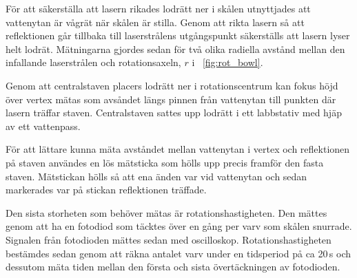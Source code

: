 \documentclass[11pt,a4paper]{article}
\newcommand{\figref}{\figurename~\ref}
\begin{document}
För att säkerställa att lasern rikades lodrätt ner i skålen utnyttjades att vattenytan är vågrät när skålen är stilla. Genom att rikta lasern så att reflektionen går tillbaka till laserstrålens utgångspunkt säkerställs att lasern lyser helt lodrät. Mätningarna gjordes sedan för två olika radiella avstånd mellan den infallande laserstrålen och rotationsaxeln, $r$ i \figref{fig:rot_bowl}.

Genom att centralstaven placers lodrätt ner i rotationscentrum kan fokus höjd över vertex mätas som avsåndet längs pinnen från vattenytan till punkten där lasern träffar staven. Centralstaven sattes upp lodrätt i ett labbstativ med hjäp av ett vattenpass.  

För att lättare kunna mäta avståndet mellan vattenytan i vertex och reflektionen på staven användes en lös mätsticka som hölls upp precis framför den fasta staven. Mätstickan hölls så att ena änden var vid vattenytan och sedan markerades var på stickan reflektionen träffade. 

Den sista storheten som behöver mätas är rotationshastigheten. Den mättes genom att ha en fotodiod som täcktes över en gång per varv som skålen snurrade. Signalen från fotodioden mättes sedan med oscilloskop. Rotationshastigheten bestämdes sedan genom att räkna antalet varv under en tidsperiod på ca 20\,s och dessutom mäta tiden mellan den första och sista övertäckningen av fotodioden. 
\end{document}
